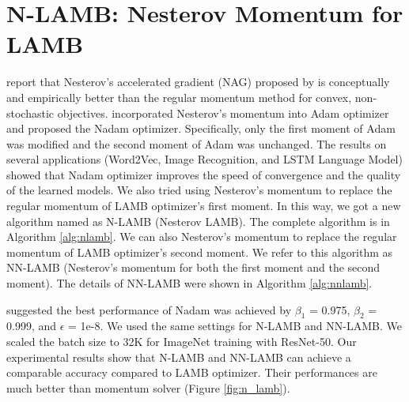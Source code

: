 \begin{figure}
\begin{minipage}[b]{.5\textwidth}
\end{minipage}
\end{figure}

\section{N-LAMB: Nesterov Momentum for LAMB}

\cite{sutskever2013importance} report that Nesterov’s accelerated gradient (NAG) proposed by \cite{nesterov1983method} is conceptually and empirically better than the regular momentum method for convex, non-stochastic objectives.
\cite{dozat2016incorporating} incorporated Nesterov’s momentum into Adam optimizer and proposed the Nadam optimizer. Specifically, only the first moment of Adam was modified and the second moment of Adam was unchanged. The results on several applications (Word2Vec, Image Recognition, and LSTM Language Model) showed that Nadam optimizer improves the speed of convergence and the quality of the learned models. We also tried using Nesterov’s momentum to replace the regular momentum of LAMB optimizer's first moment. In this way, we got a new algorithm named as N-LAMB (Nesterov LAMB). The complete algorithm is in Algorithm \ref{alg:nlamb}. We can also Nesterov’s momentum to replace the regular momentum of LAMB optimizer's second moment. We refer to this algorithm as NN-LAMB (Nesterov's momentum for both the first moment and the second moment). The details of NN-LAMB were shown in Algorithm \ref{alg:nnlamb}.

\cite{dozat2016incorporating} suggested the best performance of Nadam was achieved by $\beta_1$ = 0.975, $\beta_2$ = 0.999, and $\epsilon$ = 1e-8. We used the same settings for N-LAMB and NN-LAMB. We scaled the batch size to 32K for ImageNet training with ResNet-50. Our experimental results show that N-LAMB and NN-LAMB can achieve a comparable accuracy compared to LAMB optimizer. Their performances are much better than momentum solver (Figure \ref{fig:n_lamb}).

